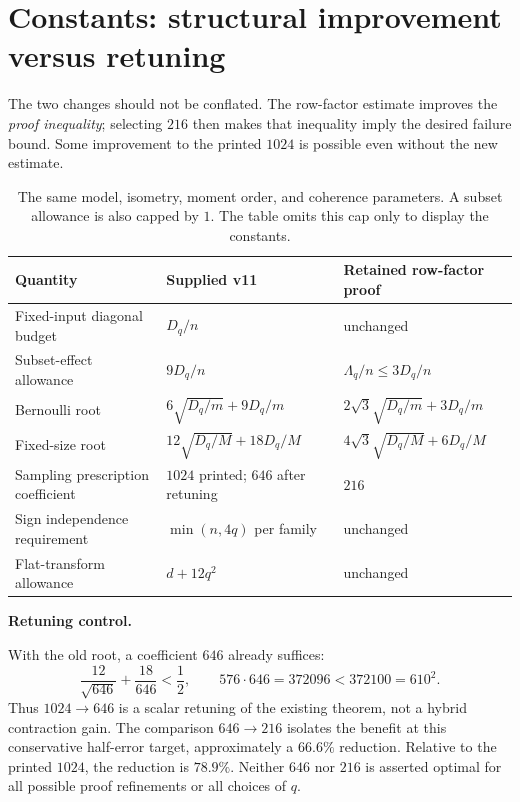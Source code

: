 \documentclass[11pt]{article}
\numberwithin{equation}{section}
\theoremstyle{definition}\newtheorem{definition}[theorem]{Definition}
\theoremstyle{remark}\newtheorem{remark}[theorem]{Remark}
\newcommand{\step}[1]{\par\addvspace{.65\baselineskip}\Needspace{4\baselineskip}\noindent\textbf{#1}\par\nobreak\smallskip}
\begin{document}
\clearpage
\section{Constants: structural improvement versus retuning}
\label{sec:constants}
The two changes should not be conflated. The row-factor estimate improves the \emph{proof inequality}; selecting $216$ then makes that inequality imply the desired failure bound. Some improvement to the printed $1024$ is possible even without the new estimate.

\begin{table}[htbp]\centering\small
\renewcommand{\arraystretch}{1.25}\setlength{\tabcolsep}{4pt}
\begin{tabularx}{\textwidth}{@{}P{.26\textwidth}Y Y@{}}
\toprule
Quantity & Supplied v11 & Retained row-factor proof\\
\midrule
Fixed-input diagonal budget & $D_q/n$ & unchanged\\
Subset-effect allowance & $9D_q/n$ & $\Lambda_q/n\le3D_q/n$\\
Bernoulli root & $6\sqrt{D_q/m}+9D_q/m$ & $2\sqrt3\sqrt{D_q/m}+3D_q/m$\\
Fixed-size root & $12\sqrt{D_q/M}+18D_q/M$ & $4\sqrt3\sqrt{D_q/M}+6D_q/M$\\
Sampling prescription coefficient & $1024$ printed; $646$ after retuning & $216$\\
Sign independence requirement & $\min(n,4q)$ per family & unchanged\\
Flat-transform allowance & $d+12q^2$ & unchanged\\
\bottomrule
\end{tabularx}
\caption{The same model, isometry, moment order, and coherence parameters. A subset allowance is also capped by $1$. The table omits this cap only to display the constants.}
\label{tab:structure}
\end{table}

\step{Retuning control.}
With the old root, a coefficient $646$ already suffices:
\[
 \frac{12}{\sqrt{646}}+\frac{18}{646}<\frac12,
 \qquad 576\cdot646=372096<372100=610^2.
\]
Thus $1024\to646$ is a scalar retuning of the existing theorem, not a hybrid contraction gain. The comparison $646\to216$ isolates the benefit at this conservative half-error target, approximately a $66.6\%$ reduction. Relative to the printed $1024$, the reduction is $78.9\%$. Neither $646$ nor $216$ is asserted optimal for all possible proof refinements or all choices of $q$.
\end{document}
